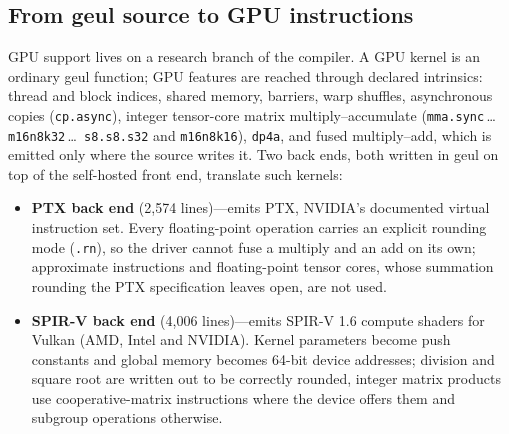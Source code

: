 \documentclass[11pt]{article}
\begin{document}
\subsection{From geul source to GPU instructions}

GPU support lives on a research branch of the compiler. A GPU kernel is an ordinary geul function; GPU features are reached
through declared intrinsics: thread and block indices, shared memory, barriers, warp shuffles, asynchronous copies
(\texttt{cp.async}), integer tensor-core matrix multiply--accumulate (\texttt{mma.sync}\,\dots\,\texttt{m16n8k32}\,\dots\,%
\texttt{s8.s8.s32} and \texttt{m16n8k16}), \texttt{dp4a}, and fused multiply--add, which is emitted only where the source
writes it. Two back ends, both written in geul on top of the self-hosted front end, translate such kernels:

\begin{itemize}
\item \textbf{PTX back end} (2,574 lines)---emits PTX, NVIDIA's documented virtual instruction set. Every floating-point
      operation carries an explicit rounding mode (\texttt{.rn}), so the driver cannot fuse a multiply and an add on its
      own; approximate instructions and floating-point tensor cores, whose summation rounding the PTX specification leaves
      open, are not used.
\item \textbf{SPIR-V back end} (4,006 lines)---emits SPIR-V 1.6 compute shaders for Vulkan (AMD, Intel and NVIDIA). Kernel
      parameters become push constants and global memory becomes 64-bit device addresses; division and square root are
      written out to be correctly rounded, integer matrix products use cooperative-matrix instructions where the device
      offers them and subgroup operations otherwise.
\end{itemize}
\end{document}
